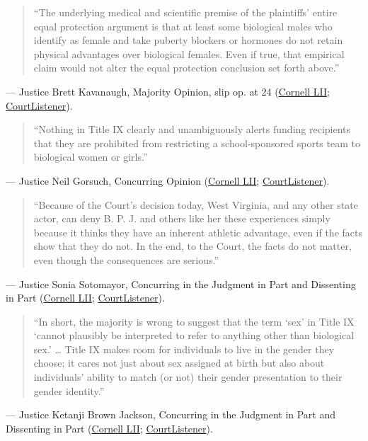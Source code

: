 \documentclass[12pt]{article}
\begin{document}
\begin{quote}
``The underlying medical and scientific premise of the plaintiffs' entire equal protection argument is that at least some biological males who identify as female and take puberty blockers or hormones do not retain physical advantages over biological females. Even if true, that empirical claim would not alter the equal protection conclusion set forth above.''
\end{quote}
\noindent --- Justice Brett Kavanaugh, Majority Opinion, slip op. at 24 (\href{https://www.law.cornell.edu/supremecourt/text/24-43}{Cornell LII}; \href{https://www.courtlistener.com/opinion/10882186/west-virginia-v-b-p-j/}{CourtListener}).

\begin{quote}
``Nothing in Title IX clearly and unambiguously alerts funding recipients that they are prohibited from restricting a school-sponsored sports team to biological women or girls.''
\end{quote}
\noindent --- Justice Neil Gorsuch, Concurring Opinion (\href{https://www.law.cornell.edu/supremecourt/text/24-43}{Cornell LII}; \href{https://www.courtlistener.com/opinion/10882186/west-virginia-v-b-p-j/}{CourtListener}).

\begin{quote}
``Because of the Court's decision today, West Virginia, and any other state actor, can deny B. P. J. and others like her these experiences simply because it thinks they have an inherent athletic advantage, even if the facts show that they do not. In the end, to the Court, the facts do not matter, even though the consequences are serious.''
\end{quote}
\noindent --- Justice Sonia Sotomayor, Concurring in the Judgment in Part and Dissenting in Part (\href{https://www.law.cornell.edu/supremecourt/text/24-43}{Cornell LII}; \href{https://www.courtlistener.com/opinion/10882186/west-virginia-v-b-p-j/}{CourtListener}).

\begin{quote}
``In short, the majority is wrong to suggest that the term `sex' in Title IX `cannot plausibly be interpreted to refer to anything other than biological sex.' \dots{} Title IX makes room for individuals to live in the gender they choose; it cares not just about sex assigned at birth but also about individuals' ability to match (or not) their gender presentation to their gender identity.''
\end{quote}
\noindent --- Justice Ketanji Brown Jackson, Concurring in the Judgment in Part and Dissenting in Part (\href{https://www.law.cornell.edu/supremecourt/text/24-43}{Cornell LII}; \href{https://www.courtlistener.com/opinion/10882186/west-virginia-v-b-p-j/}{CourtListener}).
\end{document}
